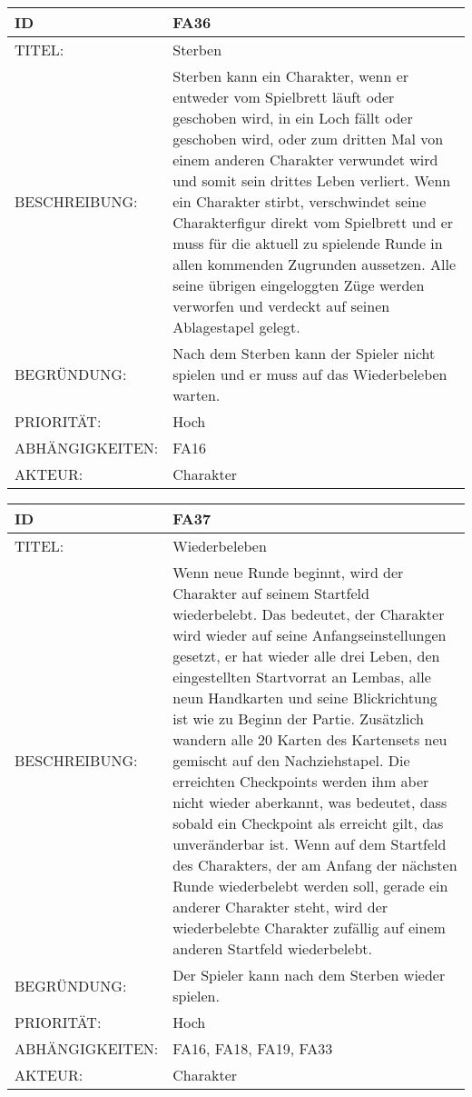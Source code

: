 \documentclass{uulm-assignment}
\begin{document}
    \begin{tabularx}{\textwidth}{|l|X |} \hline
        \textbf{ID} & \textbf{FA36} \\
        \hline
        TITEL: & Sterben\\
        \hline
        BESCHREIBUNG: &
Sterben kann ein Charakter, wenn er entweder vom Spielbrett läuft oder geschoben wird, in ein Loch
fällt oder geschoben wird, oder zum dritten Mal von einem anderen Charakter verwundet wird und
somit sein drittes Leben verliert. \newline
Wenn ein Charakter stirbt, verschwindet seine Charakterfigur direkt vom Spielbrett und er muss
für die aktuell zu spielende Runde in allen kommenden Zugrunden aussetzen. Alle seine übrigen
eingeloggten Züge werden verworfen und verdeckt auf seinen Ablagestapel gelegt.
        \\
        \hline
        BEGRÜNDUNG: & Nach dem Sterben kann der Spieler nicht spielen und er muss auf das Wiederbeleben warten.\\
        \hline
        PRIORITÄT: & Hoch\\
        \hline
        ABHÄNGIGKEITEN: & FA16\\
        \hline
        AKTEUR: & Charakter \\
        \hline
    \end{tabularx}
    
    \begin{tabularx}{\textwidth}{|l|X |} \hline
        \textbf{ID} & \textbf{FA37} \\
        \hline
        TITEL: & Wiederbeleben\\
        \hline
        BESCHREIBUNG: & Wenn neue Runde beginnt, wird der Charakter auf seinem Startfeld wiederbelebt. Das bedeutet, der Charakter wird wieder auf seine Anfangseinstellungen gesetzt, er hat wieder alle drei Leben, den eingestellten Startvorrat an Lembas, alle neun Handkarten und
seine Blickrichtung ist wie zu Beginn der Partie. Zusätzlich wandern alle 20 Karten des Kartensets
neu gemischt auf den Nachziehstapel. Die erreichten Checkpoints werden ihm aber nicht wieder
aberkannt, was bedeutet, dass sobald ein Checkpoint als erreicht gilt, das unveränderbar ist.
\newline Wenn auf dem Startfeld des Charakters, der am Anfang der nächsten Runde wiederbelebt werden
soll, gerade ein anderer Charakter steht, wird der wiederbelebte Charakter zufällig auf einem anderen
Startfeld wiederbelebt.
        \\
        \hline
        BEGRÜNDUNG: & Der Spieler kann nach dem Sterben wieder spielen. \\
        \hline
        PRIORITÄT: & Hoch\\
        \hline
        ABHÄNGIGKEITEN: & FA16, FA18, FA19, FA33\\
        \hline
        AKTEUR: & Charakter\\
        \hline
    \end{tabularx}
    
\end{document}
